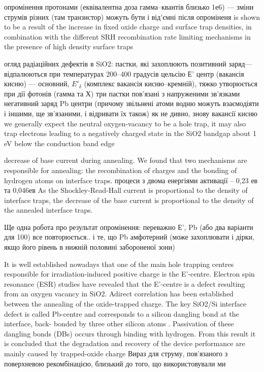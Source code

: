 \documentclass[a4paper,14pt,oneside,openany]{memoir}
\begin{document}
опромінення протонами (еквівалентна доза гамма--квантів близько 1е6) --- зміни струмів різних (там транзистор) можуть бути і від'ємні після опроміненя
is  shown  to be  a result  of  the increase  in  fixed oxide  charge  and  surface  trap  densities,  in combination with the different SRH  recombination rate limiting
mechanisms in the presence of high density surface traps \cite{SiO2:Niu}

огляд радіаційних дефектів в SiO2:
пастки, які захоплюють позитивний заряд--- відпалюються при температурах 200--400 градусів цельсію
Е' центр (вакансія кисню) --- основний,
$E'_\delta$ (комплекс вакансія кисню--кремній), тяжко утворюється при дії фотонів (гамма та Х)
три пастки пов'язані з напруженими зв'язками
негативний заряд
Pb центри (причому звільнені атоми водню можуть взаємодіяти і іншими, ще зв'язаними, і відривати їх також)
як не дивно, знову вакансії кисню
we generally expect the neutral oxygen-vacancy to be a hole trap, it may also trap electrons leading  to a negatively charged state in the SiO2  bandgap
about 1  eV below the conduction band edge \cite{SiO2:Devine}

decrease of base current during annealing. We  found that two mechanisms
are responsible for annealing: the recombination  of charges and
the bonding of hydrogen atoms on interface traps.
процеси з двома енергіями активації -- 0,23 ев та 0,046ев
As  the  Shockley-Read-Hall  current  is  proportional to the
density of  interface traps,  the decrease of  the base current
is proportional to  the  density of  the  annealed interface traps. \cite{SiO2:Wurzer}

Ще одна робота про результат опромінення: переважно Е', Pb (або два варіанти для 100) все повторюється..
і те, що Pb амфотерний (може захоплювати і дірки, якщо його рівень в нижній половині забороненої зони)\cite{SiO2:Lenahan}

It is well established nowadays that one of the main hole trapping centres responsible for irradiation-induced positive
charge is the E'-centre. Electron spin resonance (ESR)
studies have revealed that the E'-centre is a defect resulting
from an oxygen vacancy in SiO2. Adirect correlation has been
established between the annealing of the oxide-trapped charge.
The key SiO2/Si interface defect is called Pb-centre and
corresponds to a silicon dangling bond at the interface, back-
bonded by three other silicon atoms . Passivation of these dangling bonds (DBs) occurs
through binding with hydrogen.
From this result it is concluded that the degradation
and recovery of the device performance are mainly caused by
trapped-oxide charge
Вираз для струму, пов'язаного з поверхневою рекомбінацією, близький до того, що використовували ми
\cite{SiO2:Takakura}
\end{document}
